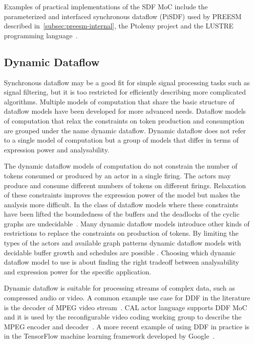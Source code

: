 Examples of practical implementations of the SDF MoC include the parameterized and interfaced synchronous dataflow (PiSDF) used by PREESM described in~\ref{subsec:preesm-internal}, the Ptolemy project \cite{ekerjanneck2003ptolemy} and the LUSTRE programming language~\cite{halbwachs1991synchronous}.

\FloatBarrier
\subsection{Dynamic Dataflow}
\label{subsec:dynamic-dataflow}
Synchronous dataflow may be a good fit for simple signal processing tasks such as signal filtering, but it is too restricted for efficiently describing more complicated algorithms. Multiple models of computation that share the basic structure of dataflow models have been developed for more advanced needs. Dataflow models of computation that relax the constraints on token production and consumption are grouped under the name dynamic dataflow. Dynamic dataflow does not refer to a single model of computation but a group of models that differ in terms of expression power and analysability.~\cite{bhattacharyya2013handbook}

The dynamic dataflow models of computation do not constrain the number of tokens consumed or produced by an actor in a single firing. The actors may produce and consume different numbers of tokens on different firings. Relaxation of these constraints improves the expression power of the model but makes the analysis more difficult. In the class of dataflow models where these constraints have been lifted the boundedness of the buffers and the deadlocks of the cyclic graphs are undecidable~\cite{buck1993scheduling}. Many dynamic dataflow models introduce other kinds of restrictions to replace the constraints on production of tokens. By limiting the types of the actors and available graph patterns dynamic dataflow models with decidable buffer growth and schedules are possible \cite{bhattacharyya2013handbook, gao1992well}. Choosing which dynamic dataflow model to use is about finding the right tradeoff between analysability and expression power for the specific application.

Dynamic dataflow is suitable for processing streams of complex data, such as compressed audio or video. A common example use case for DDF in the literature is the decoder of MPEG video stream~\cite{bhattacharyya2013handbook}. CAL actor language supports DDF MoC and it is used by the reconfigurable video coding working group to describe the MPEG encoder and decoder~\cite{bhattacharyya2011overview}. A more recent example of using DDF in practice is in the TensorFlow machine learning framework developed by Google~\cite{tensorflow2015-whitepaper}.
